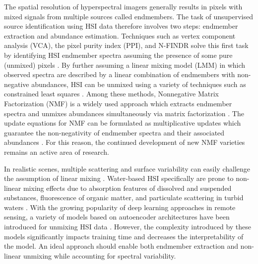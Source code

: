 \documentclass[remotesensing,article,submit,pdftex,moreauthors]{Definitions/mdpi}
\begin{document}
The spatial resolution of hyperspectral imagers generally results in pixels with mixed signals from multiple sources called endmembers. The task of unsupervised source identification using HSI data therefore involves two steps: endmember extraction and abundance estimation. Techniques such as vertex component analysis (VCA), the pixel purity index (PPI), and N-FINDR solve this first task by identifying HSI endmember spectra assuming the presence of some pure (unmixed) pixels \cite{vca-orig, ppi-orig, N-FINDR-orig}. By further assuming a linear mixing model (LMM) in which observed spectra are described by a linear combination of endmembers with non-negative abundances, HSI can be unmixed using a variety of techniques such as constrained least squares \cite{spectral-unmixing-orig, fcls-unmixing}. Among these methods, Nonnegative Matrix Factorization (NMF) is a widely used approach which extracts endmember spectra and unmixes abundances simultaneously via matrix factorization \cite{nmf-orig, unmixing-nmf-review, unmixing-nmf-review-2}. The update equations for NMF can be formulated as multiplicative updates which guarantee the non-negativity of endmember spectra and their associated abundances \cite{nmf-algorithms}.  For this reason, the continued development of new NMF varieties remains an active area of research.

In realistic scenes, multiple scattering and surface variability can easily challenge the assumption of linear mixing \cite{heylen2014review}. Water-based HSI specifically are prone to non-linear mixing effects due to absorption features of dissolved and suspended substances, fluorescence of organic matter, and particulate scattering in turbid waters \cite{hsi-absorption, hsi-fluorescence, hsi-turibidity}. With the growing popularity of deep learning approaches in remote sensing, a variety of models based on autoencoder architectures have been introduced for unmixing HSI data \cite{non-negative-autoencoders,su2019daen,borsoi2019deep,palsson2020convolutional}. However, the complexity introduced by these models significantly impacts training time and decreases the interpretability of the model. An ideal approach should enable both endmember extraction and non-linear unmixing while accounting for spectral variability. 
\end{document}
